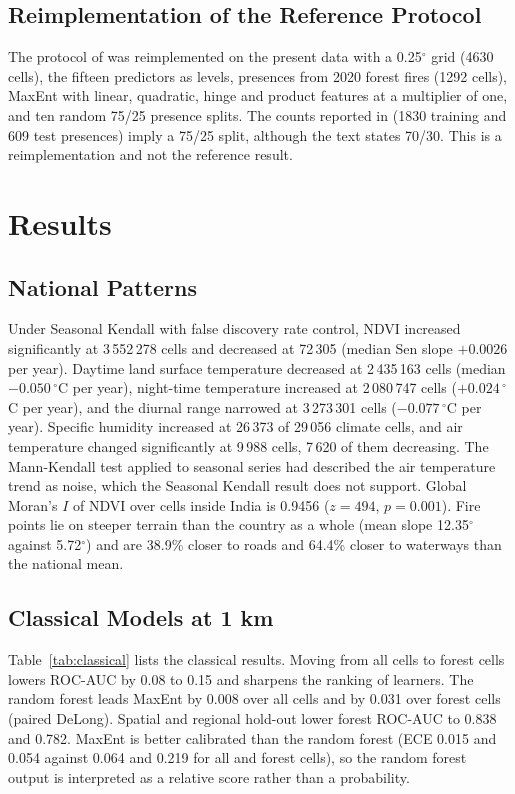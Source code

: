 \documentclass[journal]{IEEEtran}
\newcommand{\auc}{ROC-AUC}
\begin{document}
\subsection{Reimplementation of the Reference Protocol}
The protocol of \cite{biswas2025} was reimplemented on the present data with a 0.25$^\circ$ grid (4630 cells), the fifteen predictors as levels, presences from 2020 forest fires (1292 cells), MaxEnt with linear, quadratic, hinge and product features at a multiplier of one, and ten random 75/25 presence splits. The counts reported in \cite{biswas2025} (1830 training and 609 test presences) imply a 75/25 split, although the text states 70/30. This is a reimplementation and not the reference result.

\section{Results}
\label{sec:results}

\subsection{National Patterns}
Under Seasonal Kendall with false discovery rate control, NDVI increased significantly at 3\,552\,278 cells and decreased at 72\,305 (median Sen slope $+0.0026$ per year). Daytime land surface temperature decreased at 2\,435\,163 cells (median $-0.050\,^\circ$C per year), night-time temperature increased at 2\,080\,747 cells ($+0.024\,^\circ$C per year), and the diurnal range narrowed at 3\,273\,301 cells ($-0.077\,^\circ$C per year). Specific humidity increased at 26\,373 of 29\,056 climate cells, and air temperature changed significantly at 9\,988 cells, 7\,620 of them decreasing. The Mann-Kendall test applied to seasonal series had described the air temperature trend as noise, which the Seasonal Kendall result does not support. Global Moran's $I$ of NDVI over cells inside India is 0.9456 ($z=494$, $p=0.001$). Fire points lie on steeper terrain than the country as a whole (mean slope 12.35$^\circ$ against 5.72$^\circ$) and are 38.9\% closer to roads and 64.4\% closer to waterways than the national mean.

\subsection{Classical Models at 1 km}
Table~\ref{tab:classical} lists the classical results. Moving from all cells to forest cells lowers \auc{} by 0.08 to 0.15 and sharpens the ranking of learners. The random forest leads MaxEnt by 0.008 over all cells and by 0.031 over forest cells (paired DeLong). Spatial and regional hold-out lower forest \auc{} to 0.838 and 0.782. MaxEnt is better calibrated than the random forest (ECE 0.015 and 0.054 against 0.064 and 0.219 for all and forest cells), so the random forest output is interpreted as a relative score rather than a probability.
\end{document}
